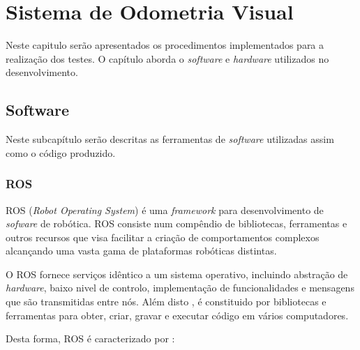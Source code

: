 \chapter{Sistema de Odometria Visual} \label{chap:sist}

Neste capitulo serão apresentados os procedimentos implementados para a realização dos testes. O capítulo aborda o \textit{software} e \textit{hardware} utilizados no desenvolvimento.

\section{Software}

Neste subcapítulo serão descritas as ferramentas de \textit{software} utilizadas assim como o código produzido.

\subsection{ROS}

ROS (\textit{Robot Operating System}) é uma \textit{framework} para desenvolvimento de \textit{sofware} de robótica. ROS consiste num compêndio de bibliotecas, ferramentas e outros recursos que visa facilitar a criação de comportamentos complexos alcançando uma vasta gama de plataformas robóticas distintas. 

O ROS fornece serviços idêntico a um sistema operativo, incluindo abstração de \textit{hardware}, baixo nivel de controlo, implementação de funcionalidades e mensagens que são transmitidas entre nós. Além disto , é constituido por bibliotecas e ferramentas para obter, criar, gravar e executar código em vários computadores. 

Desta forma, ROS  é caracterizado por :

